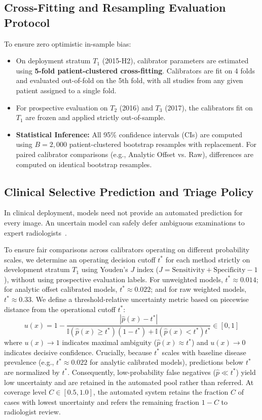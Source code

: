 \documentclass[journal]{IEEEtran}
\begin{document}
\subsection{Cross-Fitting and Resampling Evaluation Protocol}
To ensure zero optimistic in-sample bias:
\begin{itemize}
    \item On deployment stratum $T_1$ (2015-H2), calibrator parameters are estimated using \textbf{5-fold patient-clustered cross-fitting}. Calibrators are fit on 4 folds and evaluated out-of-fold on the 5th fold, with all studies from any given patient assigned to a single fold.
    \item For prospective evaluation on $T_2$ (2016) and $T_3$ (2017), the calibrators fit on $T_1$ are frozen and applied strictly out-of-sample.
    \item \textbf{Statistical Inference:} All 95\% confidence intervals (CIs) are computed using $B = 2,000$ patient-clustered bootstrap resamples with replacement. For paired calibrator comparisons (e.g., Analytic Offset vs. Raw), differences are computed on identical bootstrap resamples.
\end{itemize}

\subsection{Clinical Selective Prediction and Triage Policy}
In clinical deployment, models need not provide an automated prediction for every image. An uncertain model can safely defer ambiguous examinations to expert radiologists~\cite{geifman2017selective, kompa2021second}.

To ensure fair comparisons across calibrators operating on different probability scales, we determine an operating decision cutoff $t^*$ for each method strictly on development stratum $T_1$ using Youden's $J$ index ($J = \text{Sensitivity} + \text{Specificity} - 1$), without using prospective evaluation labels. For unweighted models, $t^* \approx 0.014$; for analytic offset calibrated models, $t^* \approx 0.022$; and for raw weighted models, $t^* \approx 0.33$. We define a threshold-relative uncertainty metric based on piecewise distance from the operational cutoff $t^*$:
\begin{equation}
u(x) = 1 - \frac{|\hat{p}(x) - t^*|}{\mathbb{I}(\hat{p}(x) \ge t^*)(1 - t^*) + \mathbb{I}(\hat{p}(x) < t^*)t^*} \in [0, 1]
\label{eq:uncertainty}
\end{equation}
where $u(x) \to 1$ indicates maximal ambiguity ($\hat{p}(x) \approx t^*$) and $u(x) \to 0$ indicates decisive confidence. Crucially, because $t^*$ scales with baseline disease prevalence (e.g., $t^* \approx 0.022$ for analytic calibrated models), predictions below $t^*$ are normalized by $t^*$. Consequently, low-probability false negatives ($\hat{p} \ll t^*$) yield low uncertainty and are retained in the automated pool rather than referred. At coverage level $C \in [0.5, 1.0]$, the automated system retains the fraction $C$ of cases with lowest uncertainty and refers the remaining fraction $1 - C$ to radiologist review.
\end{document}
